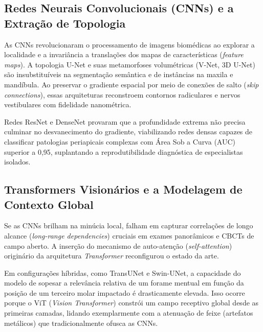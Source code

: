 \subsection{Redes Neurais Convolucionais (CNNs) e a Extração de Topologia}
\label{subsec:cnn}

As CNNs revolucionaram o processamento de imagens biomédicas ao explorar a localidade e a invariância a translações dos mapas de características (\textit{feature maps}). A topologia U-Net e suas metamorfoses volumétricas (V-Net, 3D U-Net) são insubstituíveis na segmentação semântica e de instâncias na maxila e mandíbula. Ao preservar o gradiente espacial por meio de conexões de salto (\textit{skip connections}), essas arquiteturas reconstroem contornos radiculares e nervos vestibulares com fidelidade nanométrica. 

Redes ResNet e DenseNet provaram que a profundidade extrema não precisa culminar no desvanecimento do gradiente, viabilizando redes densas capazes de classificar patologias periapicais complexas com Área Sob a Curva (AUC) superior a 0,95, suplantando a reprodutibilidade diagnóstica de especialistas isolados.

\subsection{Transformers Visionários e a Modelagem de Contexto Global}
\label{subsec:transformers}

Se as CNNs brilham na minúcia local, falham em capturar correlações de longo alcance (\textit{long-range dependencies}) cruciais em exames panorâmicos e CBCTs de campo aberto. A inserção do mecanismo de auto-atenção (\textit{self-attention}) originário da arquitetura \textit{Transformer} reconfigurou o estado da arte. 

Em configurações híbridas, como TransUNet e Swin-UNet, a capacidade do modelo de sopesar a relevância relativa de um forame mentual em função da posição de um terceiro molar impactado é drasticamente elevada. Isso ocorre porque o ViT (\textit{Vision Transformer}) constrói um campo receptivo global desde as primeiras camadas, lidando exemplarmente com a atenuação de feixe (artefatos metálicos) que tradicionalmente ofusca as CNNs.


